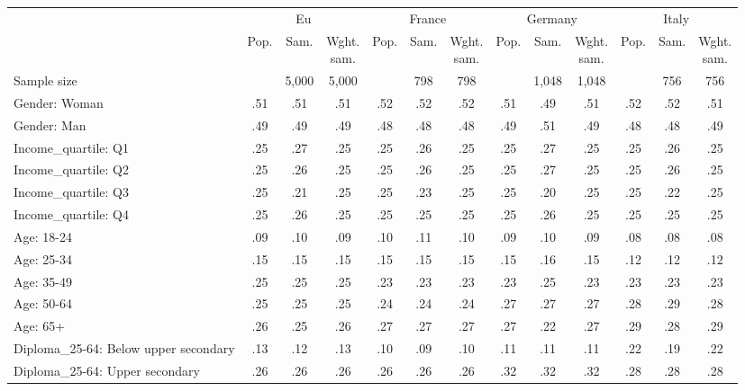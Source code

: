 
\begin{tabular}[t]{lcccccccccccc}
\toprule
\multicolumn{1}{c}{} & \multicolumn{3}{c}{Eu} & \multicolumn{3}{c}{France} & \multicolumn{3}{c}{Germany} & \multicolumn{3}{c}{Italy} \\
\cmidrule(l{3pt}r{3pt}){2-4} \cmidrule(l{3pt}r{3pt}){5-7} \cmidrule(l{3pt}r{3pt}){8-10} \cmidrule(l{3pt}r{3pt}){11-13}
  & Pop. & Sam. & \makecell{Wght.\\sam.} & Pop. & Sam. & \makecell{Wght.\\sam.} & Pop. & Sam. & \makecell{Wght.\\sam.} & Pop. & Sam. & \makecell{Wght.\\sam.}\\
\midrule
Sample size &  & 5,000 & 5,000 &  & 798 & 798 &  & 1,048 & 1,048 &  & 756 & 756\\
\addlinespace
Gender: Woman & .51 & .51 & .51 & .52 & .52 & .52 & .51 & .49 & .51 & .52 & .52 & .51\\
Gender: Man & .49 & .49 & .49 & .48 & .48 & .48 & .49 & .51 & .49 & .48 & .48 & .49\\
\addlinespace
Income\_quartile: Q1 & .25 & .27 & .25 & .25 & .26 & .25 & .25 & .27 & .25 & .25 & .26 & .25\\
Income\_quartile: Q2 & .25 & .26 & .25 & .25 & .26 & .25 & .25 & .27 & .25 & .25 & .26 & .25\\
Income\_quartile: Q3 & .25 & .21 & .25 & .25 & .23 & .25 & .25 & .20 & .25 & .25 & .22 & .25\\
Income\_quartile: Q4 & .25 & .26 & .25 & .25 & .25 & .25 & .25 & .26 & .25 & .25 & .25 & .25\\
\addlinespace
Age: 18-24 & .09 & .10 & .09 & .10 & .11 & .10 & .09 & .10 & .09 & .08 & .08 & .08\\
Age: 25-34 & .15 & .15 & .15 & .15 & .15 & .15 & .15 & .16 & .15 & .12 & .12 & .12\\
Age: 35-49 & .25 & .25 & .25 & .23 & .23 & .23 & .23 & .25 & .23 & .23 & .23 & .23\\
Age: 50-64 & .25 & .25 & .25 & .24 & .24 & .24 & .27 & .27 & .27 & .28 & .29 & .28\\
Age: 65+ & .26 & .25 & .26 & .27 & .27 & .27 & .27 & .22 & .27 & .29 & .28 & .29\\
\addlinespace
Diploma\_25-64: Below upper secondary & .13 & .12 & .13 & .10 & .09 & .10 & .11 & .11 & .11 & .22 & .19 & .22\\
Diploma\_25-64: Upper secondary & .26 & .26 & .26 & .26 & .26 & .26 & .32 & .32 & .32 & .28 & .28 & .28\\

\end{tabular}

